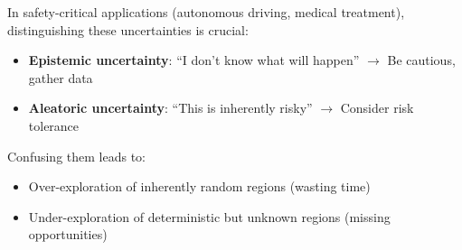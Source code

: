 \begin{remark}
In safety-critical applications (autonomous driving, medical treatment), distinguishing these uncertainties is crucial:

\begin{itemize}
    \item \textbf{Epistemic uncertainty}: ``I don't know what will happen'' $\to$ Be cautious, gather data
    \item \textbf{Aleatoric uncertainty}: ``This is inherently risky'' $\to$ Consider risk tolerance
\end{itemize}

Confusing them leads to:
\begin{itemize}
    \item Over-exploration of inherently random regions (wasting time)
    \item Under-exploration of deterministic but unknown regions (missing opportunities)
\end{itemize}
\end{remark}

